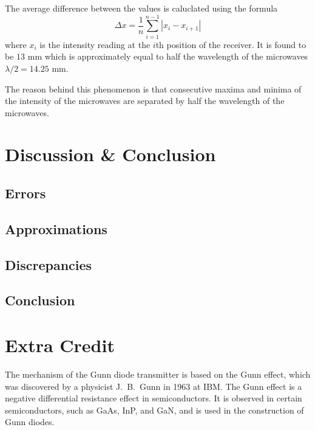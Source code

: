 \documentclass[10pt]{article}
\newcommand{\td}[1]{\todo[linecolor=blue, backgroundcolor=blue!25,bordercolor=blue, size=\small, inline]{#1}}
\begin{document}
The average difference between the values is caluclated using the formula 
\begin{equation}
  \Delta x = \dfrac{1}{n} \sum_{i=1}^{n-1} |x_i - x_{i+1}|
\end{equation}
where $x_i$ is the intensity reading at the $i$th position of the receiver. It is found to be $13$ mm which is approximately equal to half the wavelength of the microwaves $\lambda/2 = 14.25$ mm.

The reason behind this phenomenon is that consecutive maxima and minima of the intensity of the microwaves are separated by half the wavelength of the microwaves.
\td{Amirite?}

\section{Discussion \& Conclusion}

\subsection*{Errors}

\subsection*{Approximations}

\subsection*{Discrepancies}

\subsection*{Conclusion} 

\section{Extra Credit}

The mechanism of the Gunn diode transmitter is based on the Gunn effect, which was discovered by a physicist J.~B.~Gunn in 1963 at IBM. The Gunn effect is a negative differential resistance effect in semiconductors. It is observed in certain semiconductors, such as GaAs, InP, and GaN, and is used in the construction of Gunn diodes.

\end{document}
